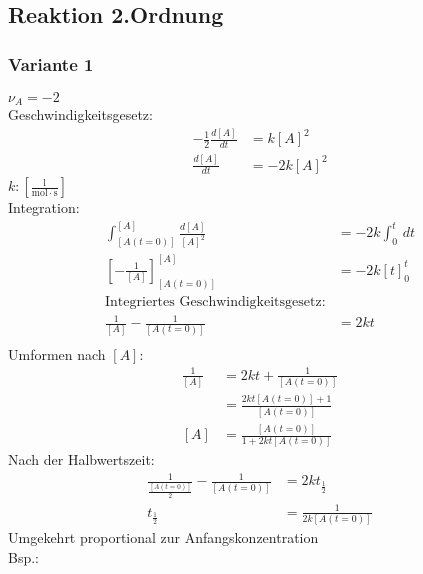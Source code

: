 \documentclass[a4paper, fleqn]{article}
\begin{document}
\subsection{Reaktion 2.Ordnung}
\subsubsection{Variante 1}
   $\nu_A = -2$\\
Geschwindigkeitsgesetz:\\
\begin{align*}
    -\frac{1}{2}\frac{d[A]}{dt} &= k[A]^2\\
    \frac{d[A]}{dt} &= -2 k [A]^2
\end{align*}
$k: [\mathrm{\frac{l}{mol\cdot s}}]$\\
Integration:
\begin{align*}
    \int_{[A(t=0)]}^{[A]} \frac{d[A]}{[A]^2} &= - 2k \int_{0}^{t} \, dt\\
    \left[-\frac{1}{[A]}\right]^{[A]}_{[A(t=0)]} &= -2k[t]_0^t\\
    \text{Integriertes Geschwindigkeitsgesetz:}\\
    \frac{1}{[A]} - \frac{1}{[A(t=0)]} &= 2kt\\
\end{align*}
Umformen nach $[A]$:\\
\begin{align*}
    \frac{1}{[A]} &= 2kt + \frac{1}{[A(t=0)]}\\
    &= \frac{2kt[A(t=0)]+1}{[A(t=0)]}\\
    [A]&=\frac{[A(t=0)]}{1+2kt[A(t=0)]}
\end{align*}
Nach der Halbwertszeit:\\
\begin{align*}
    \frac{1}{\frac{[A(t=0)]}{2}} - \frac{1}{[A(t=0)]} &= 2kt_{\frac{1}{2}}\\
    t_\frac{1}{2} &= \frac{1}{2k[A(t=0)]}
\end{align*}
Umgekehrt proportional zur Anfangskonzentration\\
Bsp.:\\
\\
\end{document}
